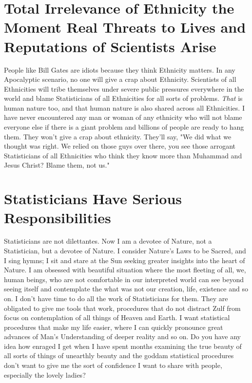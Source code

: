 \documentclass{amsart}
\begin{document}
\section{Total Irrelevance of Ethnicity the Moment Real Threats to Lives and Reputations of Scientists Arise}

People like Bill Gates are idiots because they think Ethnicity matters.  In any Apocalyptic scenario, no one will give a crap about Ethnicity.  Scientists of all Ethnicities will tribe themselves under severe public pressures everywhere in the world and blame Statisticians of all Ethnicities for all sorts of problems.  {\em That} is human nature too, and that human nature is also shared across all Ethnicities.  I have never encountered any man or woman of any ethnicity who will not blame everyone else if there is a giant problem and billions of people are ready to hang them.  They won't give a crap about ethnicity.  They'll say, "We did what we thought was right.  We relied on those guys over there, you see those arrogant Statisticians of all Ethnicities who think they know more than Muhammad and Jesus Christ?  Blame them, not us."

\section{Statisticians Have Serious Responsibilities}

Statisticians are not dilettantes.  Now I am a devotee of Nature, not a Statistician, but a devotee of Nature.  I consider Nature's Laws to be Sacred, and I sing hymns; I sit and stare at the Sun seeking greater insights into the heart of Nature.  I am obsessed with beautiful situation where the most fleeting of all, we, human beings, who are not comfortable in our interpreted world can see beyond seeing itself and contemplate the what was not our creation, life, existence and so on.  I don't have time to do all the work of Statisticians for them.  They are obligated to give me tools that work, procedures that do not distract Zulf from focus on contemplation of all things of Heaven and Earth.  I want statistical procedures that make my life easier, where I can quickly pronounce great advances of Man's Understanding of deeper reality and so on.  Do you have any idea how enraged I get when I have spent months examining the true beauty of all sorts of things of unearthly beauty and the goddam statistical procedures don't want to give me the sort of confidence I want to share with people, especially the lovely ladies?  
\end{document}
